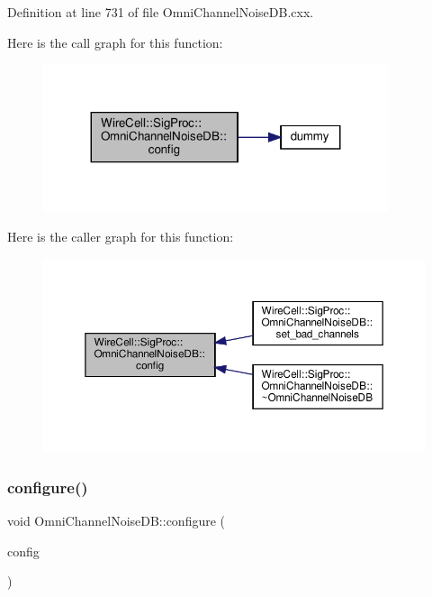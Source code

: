 Definition at line 731 of file Omni\+Channel\+Noise\+D\+B.\+cxx.

Here is the call graph for this function\+:
\nopagebreak
\begin{figure}[H]
\begin{center}
\leavevmode
\includegraphics[width=287pt]{class_wire_cell_1_1_sig_proc_1_1_omni_channel_noise_d_b_acc904d0a6472acede55bd40ef8b6cd01_cgraph}
\end{center}
\end{figure}
Here is the caller graph for this function\+:
\nopagebreak
\begin{figure}[H]
\begin{center}
\leavevmode
\includegraphics[width=350pt]{class_wire_cell_1_1_sig_proc_1_1_omni_channel_noise_d_b_acc904d0a6472acede55bd40ef8b6cd01_icgraph}
\end{center}
\end{figure}
\mbox{\label{class_wire_cell_1_1_sig_proc_1_1_omni_channel_noise_d_b_ac3cd4bc917fb51f767908130f507defd}} 
\subsubsection{\texorpdfstring{configure()}{configure()}}
{\footnotesize\ttfamily void Omni\+Channel\+Noise\+D\+B\+::configure (\begin{DoxyParamCaption}\item[{const \hyperlink{namespace_wire_cell_a9f705541fc1d46c608b3d32c182333ee}{Wire\+Cell\+::\+Configuration} \&}]{config }\end{DoxyParamCaption})\hspace{0.3cm}{\ttfamily [virtual]}}



